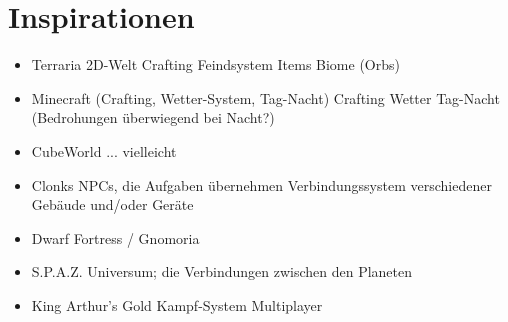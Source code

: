 \section{Inspirationen}
\label{sec:ispirationen}


	\begin{itemize}
		\item  Terraria
			\subitem	2D-Welt
			\subitem	Crafting
			\subitem	Feindsystem
			\subitem	Items
			\subitem	Biome (Orbs)
		\item  Minecraft (Crafting, Wetter-System, Tag-Nacht)
			\subitem	Crafting
			\subitem	Wetter
			\subitem	Tag-Nacht (Bedrohungen überwiegend bei Nacht?)
		\item  CubeWorld ... vielleicht
		\item  Clonks
			\subitem	NPCs, die Aufgaben übernehmen
			\subitem	Verbindungssystem verschiedener Gebäude und/oder Geräte
		\item  Dwarf Fortress / Gnomoria
		\item  S.P.A.Z.
			\subitem	Universum; die Verbindungen zwischen den Planeten
		\item  King Arthur's Gold
			\subitem	Kampf-System
			\subitem	Multiplayer
	\end{itemize}
